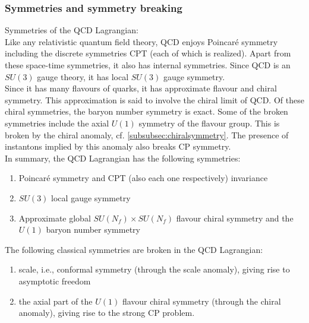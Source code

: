 \subsubsection{Symmetries and symmetry breaking}
Symmetries of the QCD Lagrangian:\\
Like any relativistic quantum field theory, QCD enjoys Poincaré symmetry including the discrete symmetries CPT (each of which is realized). Apart from these space-time symmetries, it also has internal symmetries. Since QCD is an $SU(3)$ gauge theory, it has local $SU(3)$ gauge symmetry.\\
Since it has many flavours of quarks, it has approximate flavour and chiral symmetry. This approximation is said to involve the chiral limit of QCD. Of these chiral symmetries, the baryon number symmetry is exact. Some of the broken symmetries include the axial $U(1)$ symmetry of the flavour group. This is broken by the chiral anomaly, cf. \ref{subsubsec:chiralsymmetry}. The presence of instantons implied by this anomaly also breaks CP symmetry.\\
In summary, the QCD Lagrangian has the following symmetries:
\begin{enumerate}
	\item Poincaré symmetry and CPT (also each one respectively) invariance
	\item $SU(3)$ local gauge symmetry
	\item Approximate global $SU(N_f) \times SU(N_f)$ flavour chiral symmetry and the $U(1)$ baryon number symmetry

\end{enumerate}
	The following classical symmetries are broken in the QCD Lagrangian:
	\begin{enumerate}
		\item scale, i.e., conformal symmetry (through the scale anomaly), giving rise to asymptotic freedom
		\item the axial part of the $U(1)$ flavour chiral symmetry (through the chiral anomaly), giving rise to the strong CP problem.
	\end{enumerate}

